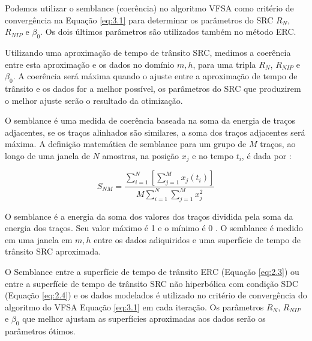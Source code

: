 Podemos utilizar o semblance (coerência) no algoritmo VFSA como critério de convergência na Equação \ref{eq:3.1}
para determinar os parâmetros do SRC $R_N$, $R_{NIP}$ e $\beta_0$. Os dois últimos parâmetros são utilizados também 
no método ERC.

Utilizando uma aproximação de tempo de trânsito SRC, medimos a coerência entre esta aproximação e os
dados no domínio $m, h$, para uma tripla $R_N$, $R_{NIP}$ e $\beta_0$.
A coerência será máxima quando o ajuste entre a aproximação de tempo de trânsito e os dados
for a melhor possível, os parâmetros do SRC que produzirem o melhor ajuste serão o resultado da otimização.

O semblance é uma medida de coerência baseada na soma da energia de traços adjacentes, se os traços alinhados são similares,
a soma dos traços adjacentes será máxima. A definição matemática de semblance para um grupo de $M$ traços, ao 
longo de uma janela de $N$ amostras, na posição $x_j$ e no tempo $t_i$, é dada por \cite{seg}:

\begin{equation}
\label{eq:3.9}
 S_{NM}=\frac{ \sum_{i=1}^N [\sum_{j=1}^M x_j(t_i)]}{M \sum_{i=1}^N \sum_{j=1}^Mx^2_{j}}
\end{equation}

O semblance é a energia da soma dos valores dos traços dividida pela soma da energia dos traços. 
Seu valor máximo é 1 e o mínimo é 0 \cite{seg}. O semblance é medido em uma janela em $m, h$ entre os dados adiquiridos 
e uma superfície de tempo de
trânsito SRC aproximada. 

O Semblance entre a superfície de tempo de trânsito ERC (Equação \ref{eq:2.3})
ou entre a superfície de tempo de trânsito SRC não hiperbólica com condição SDC (Equação \ref{eq:2.4}) 
e os dados modelados é utilizado no critério de
convergência do algoritmo do VFSA Equação \ref{eq:3.1} em cada iteração. 
Os parâmetros $R_N$, $R_{NIP}$ e $\beta_0$ que melhor
ajustam as superfícies aproximadas aos dados serão os parâmetros ótimos.